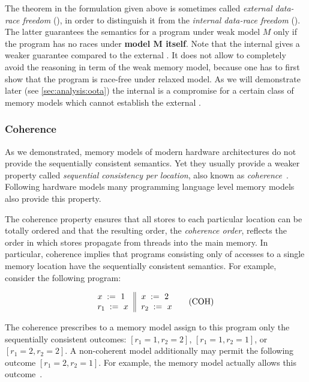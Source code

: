 The \DRF theorem in the formulation given above is 
sometimes called \emph{external data-race freedom} (\eDRF),
in order to distinguish it from the \emph{internal data-race freedom} (\iDRF). 
The latter guarantees the \SC semantics for a program 
under weak model $M$ only if the program 
has no races under \textbf{model $\mathbf{M}$ itself}.
Note that the internal \DRF gives a weaker guarantee 
compared to the external \DRF. It does not allow to completely 
avoid the reasoning in term of the weak memory model, 
because one has to first show that the program 
is race-free under relaxed model. 
As we will demonstrate later (see \cref{sec:analysis:oota})
the internal \DRF is a compromise for a certain class 
of memory models which cannot establish the external \DRF.

\subsubsection{Coherence}
\label{sec:background:coh}

As we demonstrated, memory models of 
modern hardware architectures do not 
provide the sequentially consistent semantics.
Yet they usually provide a weaker property 
called \emph{sequential consistency per location},
also known as \emph{coherence}~\cite{Alglave-al:TOPLAS14}.
Following hardware models many programming language level
memory models also provide this property. 

The coherence property ensures that 
all stores to each particular location 
can be totally ordered and that the 
resulting order, the \emph{coherence order}, reflects 
the order in which stores propagate from threads
into the main memory. 
In particular, coherence implies that  
programs consisting only of accesses to 
a single memory location have 
the sequentially consistent semantics.
For example, consider the following program:

\begin{equation*}
\inarrII{
   \writeInst{}{x}{1}   \\
   \readInst{}{r_1}{x}  \\
}{
   \writeInst{}{x}{2}   \\
   \readInst{}{r_2}{x}  \\
}
\tag{COH}\label{ex:coh}
\end{equation*}

The coherence prescribes to a memory model 
assign to this program only the 
sequentially consistent outcomes: 
${[r_1=1, r_2=2]}$, ${[r_1=1, r_2=1]}$, or ${[r_1=2, r_2=2]}$.
A non-coherent model additionally may permit 
the following outcome ${[r_1=2, r_2=1]}$.
For example, the \Java memory model actually 
allows this outcome~\cite{Manson-al:POPL05}.

